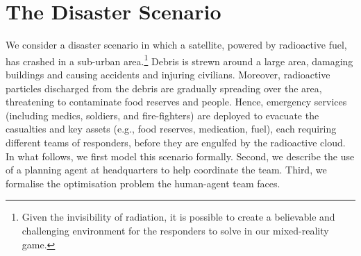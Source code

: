 \section{The Disaster Scenario}\label{sec:scenario}
\noindent We consider a disaster scenario in which a satellite, powered by radioactive fuel,  has crashed in a sub-urban area.\footnote{Given the invisibility of radiation, it is possible to create a believable and challenging environment for the responders to solve in our mixed-reality game.} Debris is strewn around a large area, damaging buildings and causing accidents and injuring civilians. Moreover, radioactive particles discharged from the debris are gradually spreading over the area, threatening to contaminate food reserves and people. Hence, emergency services (including medics, soldiers, and fire-fighters) are deployed to  evacuate the casualties and key assets (e.g., food reserves, medication, fuel), each requiring different teams of responders, before they are engulfed by the radioactive cloud.  In what follows, we first model this scenario formally. Second, we describe the use of a planning agent at headquarters to help coordinate the team. Third, we formalise  the optimisation problem the human-agent team faces.


